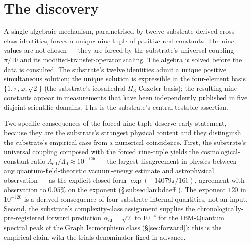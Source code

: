 \documentclass[11pt,a4paper]{amsart}
\theoremstyle{plain}
\theoremstyle{definition}
\begin{document}
\section{The discovery}

A single algebraic mechanism, parametrised by twelve substrate-derived cross-class identities, forces a unique nine-tuple of positive real constants. The nine values are not chosen --- they are forced by the substrate's universal coupling $\pi/10$ and its modified-transfer-operator scaling. The algebra is solved before the data is consulted. The substrate's twelve identities admit a unique positive simultaneous solution; the unique solution is expressible in the four-element basis $\{1,\pi,\varphi,\sqrt{2}\}$ (the substrate's icosahedral $H_3$-Coxeter basis); the resulting nine constants appear in measurements that have been independently published in five disjoint scientific domains. This is the substrate's central testable assertion.

Two specific consequences of the forced nine-tuple deserve early statement, because they are the substrate's strongest physical content and they distinguish the substrate's empirical case from a numerical coincidence. First, the substrate's universal coupling composed with the forced nine-tuple yields the cosmological-constant ratio $\Lambda_{\textsf{eff}}/\Lambda_0 \approx 10^{-120}$ --- the largest disagreement in physics between any quantum-field-theoretic vacuum-energy estimate and astrophysical observation --- as the explicit closed form $\exp(-14079\pi/160)$, agreement with observation to $0.05\%$ on the exponent (\S\ref{subsec:lambdaeff}). The exponent $120$ in $10^{-120}$ is a derived consequence of four substrate-internal quantities, not an input. Second, the substrate's complexity-class assignment supplies the chronologically-pre-registered forward prediction $\alpha_{\textsf{GI}} = \sqrt{2}$ to $10^{-4}$ for the IBM-Quantum spectral peak of the Graph Isomorphism class (\S\ref{sec:forward}); this is the empirical claim with the trials denominator fixed in advance.
\end{document}
